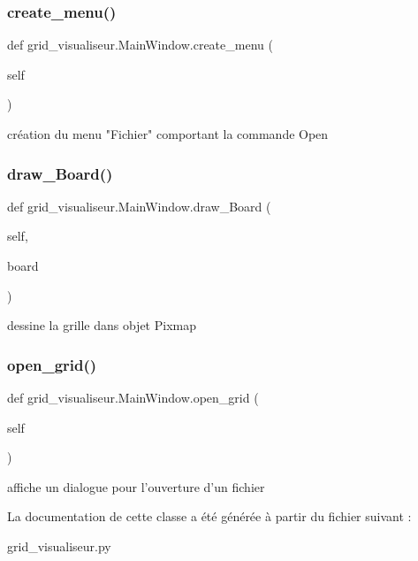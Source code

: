 \subsubsection{\texorpdfstring{create\+\_\+menu()}{create\_menu()}}
{\footnotesize\ttfamily def grid\+\_\+visualiseur.\+Main\+Window.\+create\+\_\+menu (\begin{DoxyParamCaption}\item[{}]{self }\end{DoxyParamCaption})}

\begin{DoxyVerb}création du menu "Fichier" comportant la commande Open \end{DoxyVerb}
 \mbox{\label{classgrid__visualiseur_1_1MainWindow_a4915c6cc9059cb6949bc8d1e997e1af1}} 
\subsubsection{\texorpdfstring{draw\+\_\+\+Board()}{draw\_Board()}}
{\footnotesize\ttfamily def grid\+\_\+visualiseur.\+Main\+Window.\+draw\+\_\+\+Board (\begin{DoxyParamCaption}\item[{}]{self,  }\item[{}]{board }\end{DoxyParamCaption})}

\begin{DoxyVerb}dessine la grille dans objet Pixmap \end{DoxyVerb}
 \mbox{\label{classgrid__visualiseur_1_1MainWindow_a6d4f89a1640755a326a358026815ca66}} 
\subsubsection{\texorpdfstring{open\+\_\+grid()}{open\_grid()}}
{\footnotesize\ttfamily def grid\+\_\+visualiseur.\+Main\+Window.\+open\+\_\+grid (\begin{DoxyParamCaption}\item[{}]{self }\end{DoxyParamCaption})}

\begin{DoxyVerb}affiche un dialogue pour l'ouverture d'un fichier \end{DoxyVerb}
 

La documentation de cette classe a été générée à partir du fichier suivant \+:\begin{DoxyCompactItemize}
\item 
grid\+\_\+visualiseur.\+py\end{DoxyCompactItemize}
